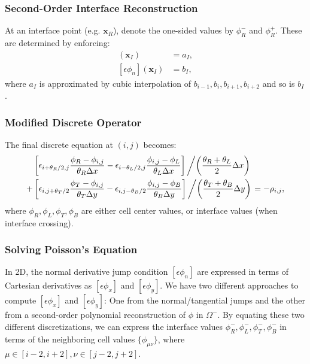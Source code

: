 \subsubsection{Second-Order Interface Reconstruction}

At an interface point (e.g. $\mathbf{x}_R$), denote the one-sided values by $\phi^-_R$ and $\phi^+_R$. These are determined by enforcing:
\begin{align}
	[\phi](\mathbf{x}_I)            & = a_I, \\
	[\epsilon \phi_n](\mathbf{x}_I) & = b_I,
\end{align}
where $a_I$ is approximated by cubic interpolation of $b_{i-1}, b_{i}, b_{i+1}, b_{i+2}$ and so is $b_I$.

\subsubsection{Modified Discrete Operator}

The final discrete equation at $(i,j)$ becomes:
\begin{equation}
	\begin{aligned}
		 & \left[
			\epsilon_{i+\theta_R/2,j} \frac{\phi_R - \phi_{i,j}}{\theta_R \Delta x}
			-
			\epsilon_{i-\theta_L/2,j} \frac{\phi_{i,j} - \phi_L}{\theta_L \Delta x}
			\right]
		\left/ \left(\frac{\theta_R+\theta_L}{2} \Delta x\right) \right. \\
		+
		 & \left[
			\epsilon_{i,j+\theta_T/2} \frac{\phi_T - \phi_{i,j}}{\theta_T \Delta y}
			-
			\epsilon_{i,j-\theta_B/2} \frac{\phi_{i,j} - \phi_B}{\theta_B \Delta y}
			\right]
		\left/ \left(\frac{\theta_T+\theta_B}{2} \Delta y\right) \right.
		= -\rho_{i,j},
	\end{aligned}
	\label{eq:modified_poisson}
\end{equation}
where $\phi_R, \phi_L, \phi_T, \phi_B$ are either cell center values, or interface values (when interface crossing).

\subsubsection{Solving Poisson's Equation}

In 2D, the normal derivative jump condition $[\epsilon \phi_n]$ are expressed in terms of Cartesian derivatives as $[\epsilon \phi_x]$ and $[\epsilon \phi_y]$. We have two different approaches to compute $[\epsilon \phi_x]$ and $[\epsilon \phi_y]$: One from the normal/tangential jumps and the other from a second-order polynomial reconstruction of $\phi$ in $\Omega^-$. By equating these two different discretizations, we can express the interface values $\phi_R^-, \phi_L^-, \phi_T^-, \phi_B^-$ in terms of the neighboring cell values $\{\phi_{\mu\nu}\}$, where $\mu\in[i-2,i+2],\nu\in[j-2,j+2]$.

